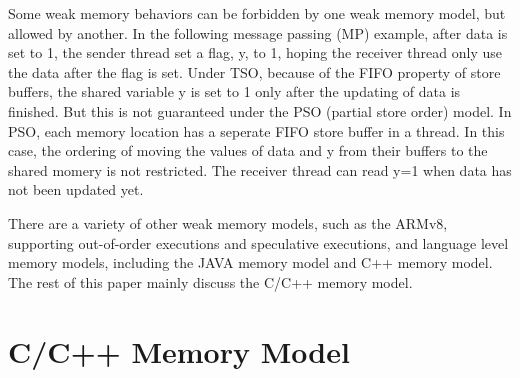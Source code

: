 Some weak memory behaviors can be forbidden by one weak memory model, but allowed by another. In the following message passing (MP) example, after data is set to 1, the sender thread set a flag, y, to 1, hoping the receiver thread only use the data after the flag is set. Under TSO, because of the FIFO property of store buffers, the shared variable y is set to 1 only after the updating of data is finished. But this is not guaranteed under the PSO (partial store order) model\cite{PSO}. In PSO, each memory location has a seperate FIFO store buffer in a thread. In this case, the ordering of moving the values of data and y from their buffers to the shared momery is not restricted. The receiver thread can read y=1 when data has not been updated yet. 

There are a variety of other weak memory models, such as the ARMv8, supporting out-of-order executions and speculative executions, and language level memory models, including the JAVA memory model\cite{java} and C++ memory model. The rest of this paper mainly discuss the C/C++ memory model\cite{c++model}. 






\section{C/C++ Memory Model}




